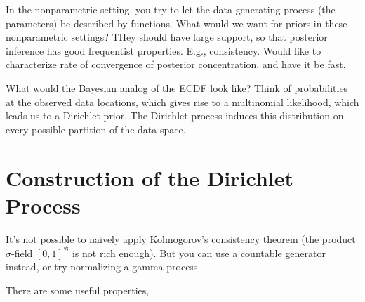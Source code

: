 \documentclass{article}
\begin{document}
In the nonparametric setting, you try to let the data generating process (the
parameters) be described by functions. What would we want for priors in these
nonparametric settings? THey should have large support, so that posterior
inference has good frequentist properties. E.g., consistency. Would like to
characterize rate of convergence of posterior concentration, and have it be
fast.

What would the Bayesian analog of the ECDF look like? Think of probabilities at
the observed data locations, which gives rise to a multinomial likelihood, which
leads us to a Dirichlet prior. The Dirichlet process induces this distribution
on every possible partition of the data space.

\section{Construction of the Dirichlet Process}

It's not possible to naively apply Kolmogorov's consistency theorem (the product
$\sigma$-field $\left[0, 1\right]^{\mathcal{B}}$ is not rich enough). But you
can use a countable generator instead, or try normalizing a gamma process.

There are some useful properties,
\end{document}
